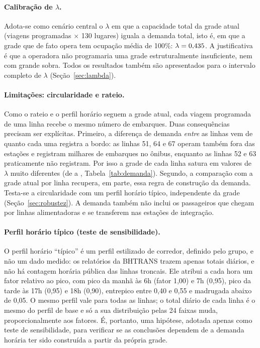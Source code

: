 \documentclass[11pt,a4paper]{article}
\newcommand{\tabela}[1]{\resizebox{\ifdim\width>\textwidth\textwidth\else\width\fi}{!}{}}
\begin{document}
\begin{table}[htbp]
\centering
\caption{Demanda diária por linha (embarques por dia útil) e $\lambda$ em que a grade atual de cada linha satura.}
\label{tab:demanda}
\small
\tabela{tabelas/demanda_bhtrans.tex}
\end{table}

\paragraph{Calibração de $\lambda$.}
Adota-se como cenário central o $\lambda$ em que a capacidade total da grade
atual (viagens programadas $\times$ 130 lugares) iguala a demanda total, isto é,
em que a grade que de fato opera tem ocupação média de 100\%:
$\lambda=0{,}435$. A justificativa é que a operadora não programaria uma
grade estruturalmente insuficiente, nem com grande sobra. Todos os resultados
também são apresentados para o intervalo completo de $\lambda$
(Seção~\ref{sec:lambda}).

\paragraph{Limitações: circularidade e rateio.}
Como o rateio e o perfil horário seguem a grade atual, cada viagem programada de
uma linha recebe o mesmo número de embarques. Duas consequências precisam ser
explícitas. Primeiro, a diferença de demanda \emph{entre} as linhas vem de quanto
cada uma registra a bordo: as linhas 51, 64 e 67 operam também fora das estações
e registram milhares de embarques no ônibus, enquanto as linhas 52 e 63
praticamente não registram. Por isso a grade de cada linha satura em valores de
$\lambda$ muito diferentes (de \lambdaMinLinha{} a \lambdaMaxLinha{},
Tabela~\ref{tab:demanda}). Segundo, a comparação com a grade atual por linha
recupera, em parte, essa regra de construção da demanda. Testa-se a
circularidade com um perfil horário típico, independente da grade
(Seção~\ref{sec:robustez}). A demanda também não inclui os passageiros que
chegam por linhas alimentadoras e se transferem nas estações de integração.

\paragraph{Perfil horário típico (teste de sensibilidade).}
O perfil horário ``típico'' é um perfil estilizado de corredor, definido pelo
grupo, e não um dado medido: os relatórios da BHTRANS trazem apenas totais
diários, e não há contagem horária pública das linhas troncais. Ele atribui a
cada hora um fator relativo ao pico, com pico da manhã às 6h (fator 1,00) e 7h
(0,95), pico da tarde às 17h (0,95) e 18h (0,90), entrepico entre 0,40 e 0,55 e
madrugada abaixo de 0,05. O mesmo perfil vale para todas as linhas; o total
diário de cada linha é o mesmo do perfil de base e só a sua distribuição pelas
24 faixas muda, proporcionalmente aos fatores. É, portanto, uma hipótese,
adotada apenas como teste de sensibilidade, para verificar se as conclusões
dependem de a demanda horária ter sido construída a partir da própria grade.
\end{document}
